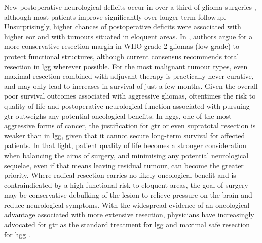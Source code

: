 New postoperative neurological deficits occur in over a third of glioma surgeries \autocite{Zetterling2020a}, although most patients improve significantly over longer-term followup.
Unsurprisingly, higher chances of postoperative deficits were associated with higher \gls{eor} and with tumours situated in eloquent areas\autocite{Zetterling2020a}.
In \textcite{Gil-Robles2010}, authors argue for a more conservative resection margin in WHO grade 2 gliomas (low-grade) to protect functional structures, although current consensus recommends total resection in \gls{lgg} wherever possible\autocite{Rincon-Torroella2019,Albuquerque2021}. %
For the most malignant tumour types, even maximal resection combined with adjuvant therapy is practically never curative, and may only lead to increases in survival of just a few months\autocite{Rincon-Torroella2019,Karschnia2023}.
Given the overall poor survival outcomes associated with aggressive gliomas, oftentimes the risk to quality of life and postoperative neurological function associated with pursuing \gls{gtr} outweighs any potential oncological benefits\autocite{Rahman2016,Tabor2021}.
In \glspl{hgg}, one of the most aggressive forms of cancer, the justification for \gls{gtr} or even supratotal resection is weaker than in \gls{lgg}, given that it cannot secure long-term survival for affected patients.
In that light, patient quality of life becomes a stronger consideration when balancing the aims of surgery, and minimising any potential neurological sequelae, even if that means leaving residual tumour, can become the greater priority.
Where radical resection carries no likely oncological benefit and is contraindicated by a high functional risk to eloquent areas, the goal of surgery may be conservative debulking of the lesion to relieve pressure on the brain and reduce neurological symptoms.
With the widespread evidence of an oncological advantage associated with more extensive resection, physicians have increasingly advocated for \gls{gtr} as the standard treatment for \gls{lgg} and maximal safe resection for \gls{hgg} \autocite{Rincon-Torroella2019}.
